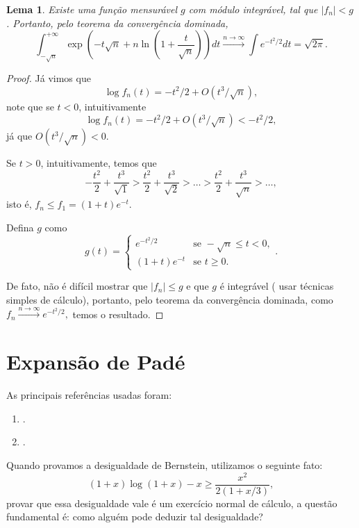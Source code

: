 \documentclass[12pt,a4paper,oneside]{book}
\newtheorem{lemma}[theorem]{Lema}
\theoremstyle{definition}
\theoremstyle{remark}
\numberwithin{equation}{section}
\newcommand{\rarrowlimn}{\xrightarrow{n\rightarrow \infty}}
\begin{document}
\begin{lemma} 
Existe uma função mensurável  $g$ com módulo integrável, tal que $|f_n|< g$. Portanto, pelo teorema da convergência dominada,
$$ \int_{-\sqrt{n}}^{+\infty}  \exp\left(-t\sqrt{n}+n\ln\left(1+\dfrac{t}{\sqrt{n}}\right)\right) dt \rarrowlimn \int e^{-t^2/2}dt  = \sqrt{2\pi}.$$
\end{lemma}

\begin{proof} Já vimos que 
$$\log f_n(t) = -t^2/2 + O(t^3/\sqrt{n}), $$
note que se $t<0$, intuitivamente
$$\log f_n(t) = -t^2/2 + O(t^3/\sqrt{n})< -t^2/2, $$
já que $O(t^3/\sqrt{n})<0$.

Se $t>0$, intuitivamente, temos que 
$$-\dfrac{t^2}{2} + \dfrac{t^3}{\sqrt{1}} > \dfrac{t^2}{2} +  \dfrac{t^3}{\sqrt{2}} > \dots > \dfrac{t^2}{2} +  \dfrac{t^3}{\sqrt{n}} > \dots , $$
isto é, $f_n\leq f_1=(1+t)e^{-t}.$

Defina $g$ como
$$g(t) = 
     \begin{cases}
       e^{-t^2/2} &\text{se } -\sqrt{n}\leq  t<0,\\
      (1+t)e^{-t} &\text{se } t\geq 0.
     \end{cases}. $$

De fato, não é difícil mostrar que $|f_n|\leq g$ e que $g$ é integrável  ( usar técnicas simples de cálculo), portanto, pelo teorema da convergência dominada, como $f_n \rarrowlimn e^{-t^2/2},$ temos o resultado.
\end{proof}






\newpage
\section{Expansão de Padé}

\begin{tcolorbox}[colback = white]
As principais referências usadas foram: 
\begin{enumerate}
\item \cite{MathewsNumericalMethodsMatlab}.
\item \cite{geogebra}.
\end{enumerate}
\end{tcolorbox}

Quando provamos a desigualdade de Bernstein, utilizamos o seguinte fato:
$$(1+x)\log(1+x)-x \geq \dfrac{x^2}{2(1+x/3)}, $$
provar que essa desigualdade vale é um exercício normal de cálculo, a questão fundamental é: como alguém pode deduzir tal desigualdade?
\end{document}
